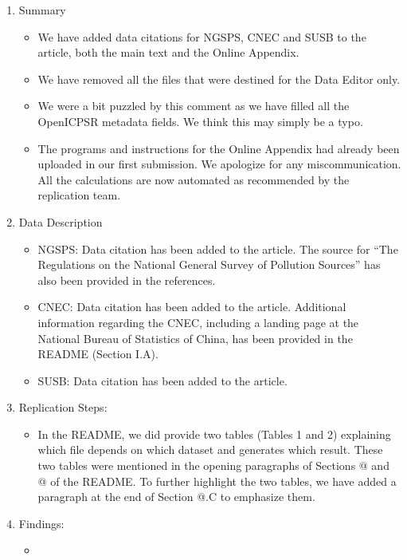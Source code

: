 \documentclass[twoside,12pt,leqno]{article}
\makeatletter
\newcommand*{\rom}[1]{\expandafter\@slowromancap\romannumeral #1@}
\makeatother
\begin{document}
\begin{enumerate}
    \item
    Summary
    \begin{itemize}
        \item
        We have added data citations for NGSPS, CNEC and SUSB to the article, both the main text and the Online Appendix.
        \item
        We have removed all the files that were destined for the Data Editor only.
        \item
        We were a bit puzzled by this comment as we have filled all the OpenICPSR metadata fields. We think this may simply be a typo.
        \item
        The programs and instructions for the Online Appendix had already been uploaded in our first submission. We apologize for any miscommunication. All the calculations are now automated as recommended by the replication team.
    \end{itemize}
    \item
    Data Description
    \begin{itemize}
        \item
        NGSPS: Data citation has been added to the article. The source for ``The Regulations on the National General Survey of Pollution Sources'' has also been provided in the references.
        \item
        CNEC: Data citation has been added to the article. Additional information regarding the CNEC, including a landing page at the National Bureau of Statistics of China, has been provided in the README (Section I.A).
        \item
        SUSB: Data citation has been added to the article.
    \end{itemize}
    \item
    Replication Steps:
    \begin{itemize}
        \item
        In the README, we did provide two tables (Tables 1 and 2) explaining which file depends on which dataset and generates which result. These two tables were mentioned in the opening paragraphs of Sections \rom{2} and \rom{3} of the README. To further highlight the two tables, we have added a paragraph at the end of Section \rom{1}.C to emphasize them.
    \end{itemize}
    \item
    Findings:
    \begin{itemize}
        \item

\end{itemize}
\end{enumerate}
\end{document}
